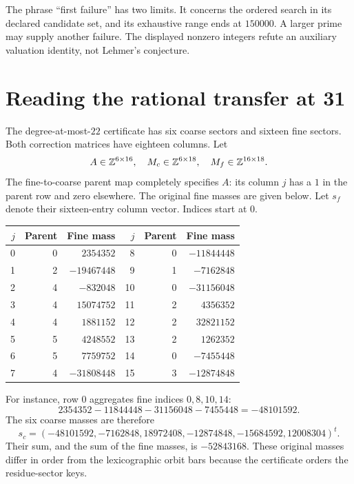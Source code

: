 The phrase ``first failure'' has two limits. It concerns the ordered search in its declared candidate set, and its exhaustive range ends at $150000$. A larger prime may supply another failure. The displayed nonzero integers refute an auxiliary valuation identity, not Lehmer's conjecture.

\section{Reading the rational transfer at 31}
\label{sec:workbook-transfer}

The degree-at-most-$22$ certificate has six coarse sectors and sixteen fine sectors. Both correction matrices have eighteen columns. Let
\[
 A\in\mathbb Z^{6\times16},\quad
 M_c\in\mathbb Z^{6\times18},\quad M_f\in\mathbb Z^{16\times18}.
\]
The fine-to-coarse parent map completely specifies $A$: its column $j$ has a $1$ in the parent row and zero elsewhere. The original fine masses are given below. Let $s_f$ denote their sixteen-entry column vector. Indices start at $0$.

\begin{center}
\begin{tabular}{r r r @{\qquad} r r r}
\toprule
$j$ & Parent & Fine mass & $j$ & Parent & Fine mass\\
\midrule
0 & 0 & $2354352$ & 8 & 0 & $-11844448$\\
1 & 2 & $-19467448$ & 9 & 1 & $-7162848$\\
2 & 4 & $-832048$ & 10 & 0 & $-31156048$\\
3 & 4 & $15074752$ & 11 & 2 & $4356352$\\
4 & 4 & $1881152$ & 12 & 2 & $32821152$\\
5 & 5 & $4248552$ & 13 & 2 & $1262352$\\
6 & 5 & $7759752$ & 14 & 0 & $-7455448$\\
7 & 4 & $-31808448$ & 15 & 3 & $-12874848$\\
\bottomrule
\end{tabular}
\end{center}

For instance, row $0$ aggregates fine indices $0,8,10,14$:
\[
 2354352-11844448-31156048-7455448=-48101592.
\]
The six coarse masses are therefore
\[
 s_c=(-48101592,-7162848,18972408,
      -12874848,-15684592,12008304)^t.
\]
Their sum, and the sum of the fine masses, is $-52843168$. These original masses differ in order from the lexicographic orbit bars because the certificate orders the residue-sector keys.

